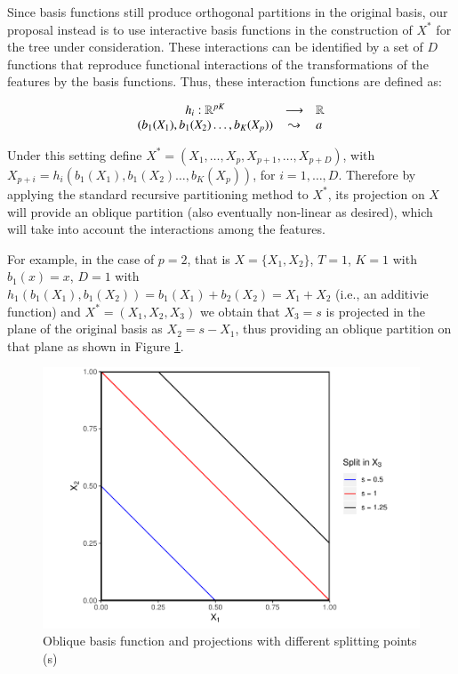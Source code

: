\documentclass[]{elsarticle} %
\makeatletter
\def\maxwidth{\ifdim\Gin@nat@width>\linewidth\linewidth
\else\Gin@nat@width\fi}
\let\Oldincludegraphics\includegraphics
\renewcommand{\includegraphics}[1]{\Oldincludegraphics[width=\maxwidth]{#1}}
\makeatother
\begin{document}
Since basis functions still produce orthogonal partitions in the
original basis, our proposal instead is to use interactive basis
functions in the construction of \(X^\ast\) for the tree under
consideration. These interactions can be identified by a set of \(D\)
functions that reproduce functional interactions of the transformations
of the features by the basis functions. Thus, these interaction
functions are defined as:

\[
\begin{array}{ccl}h_{i}:\mathbb{R}^{pK}&\longrightarrow&\mathbb{R}\\{\tiny (b_1(X_1),b_1(X_2)\dots, b_K(X_p))}&\leadsto &a\end{array}
\]

Under this setting define
\(X^{\ast }=\left( X_{1},\dots,X_{p},X_{p+1},\dots ,X_{p+D} \right)\),
with \(X_{p+i}=h_i(b_1(X_1),b_1(X_2)\dots, b_K(X_p))\), for
\(i=1,\dots ,D\). Therefore by applying the standard recursive
partitioning method to \(X^\ast\), its projection on \(X\) will provide
an oblique partition (also eventually non-linear as desired), which will
take into account the interactions among the features.

For example, in the case of \(p=2\), that is \(X=\{X_1,X_2\}\), \(T=1\),
\(K=1\) with \(b_1(x)=x\), \(D=1\) with
\(h_1(b_1(X_1),b_1(X_2))=b_1(X_1)+b_2(X_2)=X_1+X_2\) (i.e., an additivie
function) and \(X^{\ast }=\left( X_{1},X_{2},X_{3} \right)\) we obtain
that \(X_3=s\) is projected in the plane of the original basis as
\(X_2=s-X_1\), thus providing an oblique partition on that plane as
shown in Figure \ref{fig:fig4-additive-basis}.

\begin{figure}
\centering
\includegraphics{Trees_with_Base_Functions_v2_files/figure-latex/fig4-additive-basis-1.pdf}
\caption{\label{fig:fig4-additive-basis}Oblique basis function and
projections with different splitting points (s)}
\end{figure}
\end{document}
